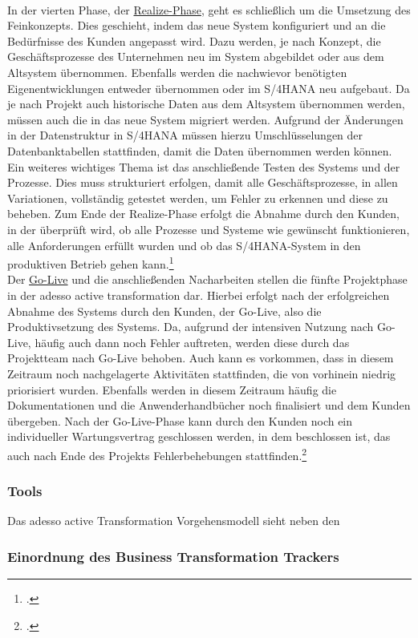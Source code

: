 \vspace{1em}
\\In der vierten Phase, der \underline{\glqq{}Realize\grqq{}-Phase}, geht es schließlich um die Umsetzung des Feinkonzepts. Dies geschieht, indem das neue System konfiguriert und an die Bedürfnisse des Kunden angepasst wird. Dazu werden, je nach Konzept, die Geschäftsprozesse des Unternehmen neu im System abgebildet oder aus dem Altsystem übernommen. Ebenfalls werden die nachwievor benötigten Eigenentwicklungen entweder übernommen oder im S/4HANA neu aufgebaut. Da je nach Projekt auch historische Daten aus dem Altsystem übernommen werden, müssen auch die in das neue System migriert werden. Aufgrund der Änderungen in der Datenstruktur in S/4HANA müssen hierzu Umschlüsselungen der Datenbanktabellen stattfinden, damit die Daten übernommen werden können. Ein weiteres wichtiges Thema ist das anschließende Testen des Systems und der Prozesse. Dies muss strukturiert erfolgen, damit alle Geschäftsprozesse, in allen Variationen, vollständig getestet werden, um Fehler zu erkennen und diese zu beheben. Zum Ende der Realize-Phase erfolgt die Abnahme durch den Kunden, in der überprüft wird, ob alle Prozesse und Systeme wie gewünscht funktionieren, alle Anforderungen erfüllt wurden und ob das S/4HANA-System in den produktiven Betrieb gehen kann.\footcite[Vgl.][]{aat-realize}\\
\vspace{1em}
Der \underline{\glqq{}Go-Live\grqq{}} und die anschließenden Nacharbeiten stellen die fünfte Projektphase in der adesso active transformation dar. Hierbei erfolgt nach der erfolgreichen Abnahme des Systems durch den Kunden, der Go-Live, also die Produktivsetzung des Systems. Da, aufgrund der intensiven Nutzung nach Go-Live, häufig auch dann noch Fehler auftreten, werden diese durch das Projektteam nach Go-Live behoben. Auch kann es vorkommen, dass in diesem Zeitraum noch nachgelagerte Aktivitäten stattfinden, die von vorhinein niedrig priorisiert wurden. Ebenfalls werden in diesem Zeitraum häufig die Dokumentationen und die Anwenderhandbücher noch finalisiert und dem Kunden übergeben. Nach der Go-Live-Phase kann durch den Kunden noch ein individueller Wartungsvertrag geschlossen werden, in dem beschlossen ist, das auch nach Ende des Projekts Fehlerbehebungen stattfinden.\footcite[Vgl.][]{aat-golive}


\subsubsection{Tools}
Das adesso active Transformation Vorgehensmodell sieht neben den 

\subsubsection{Einordnung des Business Transformation Trackers}